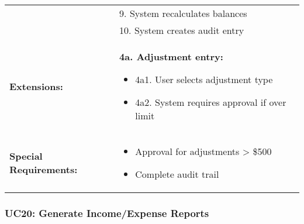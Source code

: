 \documentclass[12pt]{article}
\begin{document}
\begin{longtable}{|p{3cm}|p{11cm}|}
& 9. System recalculates balances \\
& 10. System creates audit entry \\
\hline
\textbf{Extensions:} & 
\textbf{4a. Adjustment entry:}
\begin{itemize}
    \item 4a1. User selects adjustment type
    \item 4a2. System requires approval if over limit
\end{itemize} \\
\hline
\textbf{Special Requirements:} & 
\begin{itemize}
    \item Approval for adjustments > \$500
    \item Complete audit trail
\end{itemize} \\
\hline
\end{longtable}

\subsubsection{UC20: Generate Income/Expense Reports}
\end{document}
